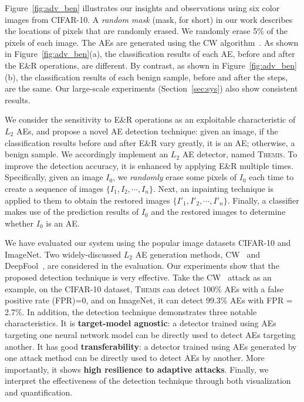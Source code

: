 \documentclass[sigconf]{acmart}
\newcommand{\blackding}[1]{\ding{\numexpr181+#1\relax}}
\newcommand{\oursys}{\textsc{Themis}\xspace}
\begin{document}
\begin{figure*} [!thb]
\centering

\quad
{}
\caption{Different impacts of  ``Erase-and-Restore'' on AEs and benign samples.}\label{fig:adv_ben}
\end{figure*}

Figure~\ref{fig:adv_ben} illustrates our insights and observations using six color images from CIFAR-10. 
A \emph{random mask} (mask, for short) in our work describes the locations of pixels that
are randomly erased. We randomly erase 5\% of the pixels of each image. 
The AEs are generated using the CW algorithm~\cite{carlini2017towards}.
As shown in Figure~\ref{fig:adv_ben}(a), 
the classification results of each AE, before and after 
the E\&R operations, are different. By contrast, as shown in Figure~\ref{fig:adv_ben}(b), the classification results of each
benign sample, before and after the steps, are the same. 
Our large-scale experiments (Section~\ref{sec:sys}) also show consistent results. 

We consider the sensitivity to E\&R operations as an exploitable characteristic of $L_2$ AEs, 
and propose a novel AE detection technique:
given an image, if the classification results before and after E\&R
vary greatly, it is an AE; otherwise, a benign sample.
We accordingly implement an  $L_2$ AE detector, named \oursys. To improve the detection accuracy,
it is enhanced by applying E\&R multiple times. 
Specifically, given an image $I_0$, we 
\emph{randomly} erase some pixels of $I_0$ each time to create a sequence of images $\{I_1, I_2, \cdots, I_n\}$. 
Next, an inpainting technique is applied to them to obtain the restored images $\{I'_1, I'_2, \cdots, I'_n\}$. Finally, a classifier makes use of the prediction results of $I_0$ and the restored images to determine whether $I_0$ is an AE.

We have evaluated our system using the popular image datasets
CIFAR-10 and ImageNet. Two widely-discussed $L_2$ AE generation methods, CW~\cite{carlini2017towards} and DeepFool~\cite{moosavi2016deepfool}, are considered in the evaluation.
Our experiments show that the proposed detection technique is very effective. Take the CW~\cite{carlini2017towards} attack as an example, on the CIFAR-10 dataset, \oursys can detect 100\% AEs with a false positive rate (FPR)=0,
and on ImageNet, it can detect 99.3\% AEs with FPR = 2.7\%. 
In addition, the detection technique demonstrates three notable characteristics.
\blackding{1} It is \textbf{target-model agnostic}: a detector trained using AEs targeting one neural network model
can be directly used to detect AEs targeting another. \blackding{2} It has good \textbf{transferability}: 
a detector trained using AEs generated by one attack method can be directly used to
detect AEs by another. \blackding{3} More importantly, it shows \textbf{high resilience to adaptive attacks}. Finally, we interpret the effectiveness of 
the detection technique through both visualization and quantification. 
\end{document}
